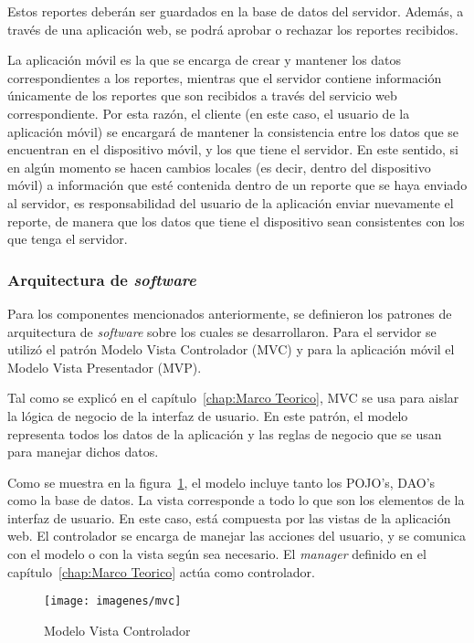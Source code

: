 Estos reportes deberán ser guardados en la base de datos del servidor. Además, a través de una aplicación web, se podrá aprobar o rechazar los reportes recibidos.

La aplicación móvil es la que se encarga de crear y mantener los datos correspondientes a los reportes, mientras que el servidor contiene información únicamente de los reportes que son recibidos a través del servicio web correspondiente. Por esta razón, el cliente (en este caso, el usuario de la aplicación móvil) se encargará de mantener la consistencia entre los datos que se encuentran en el dispositivo móvil, y los que tiene el servidor. En este sentido, si en algún momento se hacen cambios locales (es decir, dentro del dispositivo móvil) a información que esté contenida dentro de un reporte que se haya enviado al servidor, es responsabilidad del usuario de la aplicación enviar nuevamente el reporte, de manera que los datos que tiene el dispositivo sean consistentes con los que tenga el servidor.

\subsubsection{Arquitectura de \textit{software}}

Para los componentes mencionados anteriormente, se definieron los patrones de arquitectura de \textit{software} sobre los cuales se desarrollaron. Para el servidor se utilizó el patrón Modelo Vista Controlador (MVC) y para la aplicación móvil el Modelo Vista Presentador (MVP).

Tal como se explicó en el capítulo~\ref{chap:Marco Teorico}, MVC se usa para aislar la lógica de negocio de la interfaz de usuario. En este patrón, el modelo representa todos los datos de la aplicación y las reglas de negocio que se usan para manejar dichos datos. 

Como se muestra en la figura~\ref{fig:mvc}, el modelo incluye tanto los POJO's, DAO's como la base de datos. La vista corresponde a todo lo que son los elementos de la interfaz de usuario. En este caso, está compuesta por las vistas de la aplicación web. El controlador se encarga de manejar las acciones del usuario, y se comunica con el modelo o con la vista según sea necesario. El \textit{manager} definido en el capítulo~\ref{chap:Marco Teorico} actúa como controlador.

\begin{figure}[ht]
  \centering
  \texttt{[image: imagenes/mvc]}
  \caption{Modelo Vista Controlador}
  \label{fig:mvc}
\end{figure}


